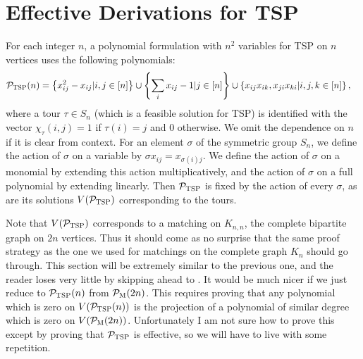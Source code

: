 \section{Effective Derivations for \textsc{TSP}}

For each integer $n$, a polynomial formulation with $n^2$ variables for \textsc{TSP} on $n$ vertices uses the following polynomials:
\begin{align*}
\mathcal P_{\textsc{TSP}}(n) &= \left\{x_{ij}^2 - x_{ij} | i,j \in [n]\right\} \cup \left\{\sum_i x_{ij} - 1 | j \in [n]\right\} \cup \left\{x_{ij}x_{ik}, x_{ji}x_{ki} | i,j,k \in [n]\right\},\label{eq:tsp-formulation}
\end{align*}
where a tour $\tau \in S_n$ (which is a feasible solution for \textsc{TSP}) is identified with the vector $\chi_\tau(i,j) = 1$ if $\tau(i) = j$ and $0$ otherwise. We omit the dependence on $n$ if it is clear from context. For an element $\sigma$ of the symmetric group $S_n$, we define the action of $\sigma$ on a variable by $\sigma x_{ij} = x_{\sigma(i)j}$.
We define the action of $\sigma$ on a monomial by extending this action multiplicatively, and the action of $\sigma$ on a full polynomial by extending linearly.
Then $\mathcal P_{\textsc{TSP}}$ is fixed by the action of every $\sigma$, as are its solutions $V(\mathcal P_{\textsc{TSP}})$ corresponding to the tours. 

Note that $V(\mathcal P_{\textsc{TSP}})$ corresponds to a matching on $K_{n,n}$, the complete bipartite graph on $2n$ vertices. Thus it should come as no surprise that the same proof strategy as the one we used for matchings on the complete graph $K_n$ should go through. This section will be extremely similar to the previous one, and the reader loses very little by skipping ahead to . It would be much nicer if we just reduce to $\mathcal P_{\textsc{TSP}}(n)$ from $\mathcal P_{\textsc{M}}(2n)$. This requires proving that any polynomial which is zero on $V(\mathcal P_{\textsc{TSP}}(n))$ is the projection of a polynomial of similar degree which is zero on $V(\mathcal P_{\textsc{M}}(2n))$. Unfortunately I am not sure how to prove this except by proving that $\mathcal P_{\textsc{TSP}}$ is effective, so we will have to live with some repetition. 

